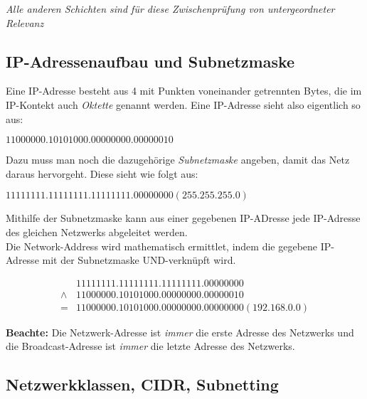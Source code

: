 \documentclass[a4paper, 12pt]{report}
\begin{document}
\emph{Alle anderen Schichten sind für diese Zwischenprüfung von untergeordneter
Relevanz}

\subsection{IP-Adressenaufbau und Subnetzmaske}

Eine IP-Adresse besteht aus 4 mit Punkten voneinander getrennten Bytes, die im
IP-Kontekt auch \emph{Oktette} genannt werden. Eine IP-Adresse sieht also
eigentlich so aus: \\

\begin{center}
$11000000.10101000.00000000.00000010$
\end{center}

Dazu muss man noch die dazugehörige \emph{Subnetzmaske} angeben, damit das Netz
daraus hervorgeht. Diese sieht wie folgt aus: \\

\begin{center}
    $11111111.11111111.11111111.00000000 (255.255.255.0)$
\end{center}

Mithilfe der Subnetzmaske kann aus einer gegebenen IP-ADresse jede IP-Adresse
des gleichen Netzwerks abgeleitet werden. \\

Die Network-Address wird mathematisch ermittlet, indem die gegebene IP-Adresse
mit der Subnetzmaske UND-verknüpft wird. \\

\begin{center}
    \begin{equation}
	\begin{aligned}
	     & 11111111.11111111.11111111.00000000 \\
	     \land & 11000000.10101000.00000000.00000010 \\
	     = & 11000000.10101000.00000000.00000000 (192.168.0.0)
	\end{aligned}
    \end{equation}
\end{center}

\textbf{Beachte:} Die Netzwerk-Adresse ist \emph{immer} die erste Adresse des
Netzwerks und die Broadcast-Adresse ist \emph{immer} die letzte Adresse des
Netzwerks.

\subsection{Netzwerkklassen, CIDR, Subnetting}
\end{document}

